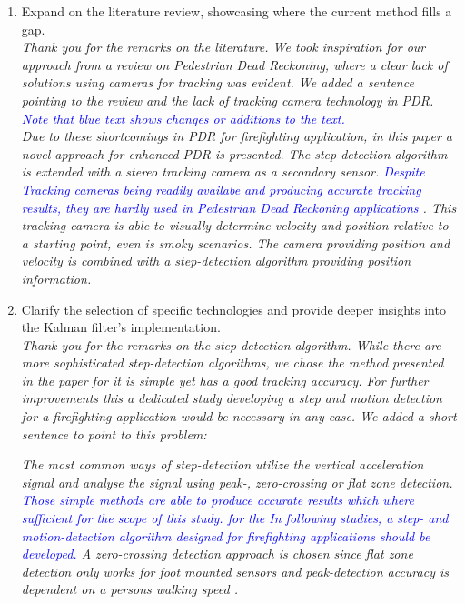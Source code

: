 \documentclass{article}
\begin{document}
\begin{enumerate}
\item Expand on the literature review, showcasing where the current method fills a gap.\\
\textit{Thank you for the remarks on the literature. We took inspiration for our approach from a review on Pedestrian Dead Reckoning, where a clear lack of solutions using cameras for tracking was evident. We added a sentence pointing to the review and the lack of tracking camera technology in PDR. \textcolor{blue}{Note that blue text shows changes or additions to the text.}}\\


\textit{Due to these shortcomings in PDR for firefighting application, in this paper  a novel approach for enhanced PDR is presented. The step-detection algorithm is extended with a stereo tracking camera as a secondary sensor. \textcolor{blue}{Despite Tracking cameras being readily availabe and producing accurate tracking results, they are hardly used in Pedestrian Dead Reckoning applications \cite{hou2021}}. This tracking camera is able to visually determine velocity and position relative to a starting point, even is smoky scenarios. The camera providing position and velocity is combined with a step-detection algorithm providing position information.}

\item Clarify the selection of specific technologies and provide deeper insights into the Kalman filter's implementation.\\
\textit{Thank you for the remarks on the step-detection algorithm. While there are more sophisticated step-detection algorithms, we chose the method presented in the paper for it is simple yet has a good tracking accuracy. For further improvements this a dedicated study developing a step and motion detection for a firefighting application would be necessary in any case. We added a short sentence to point to this problem:}

\textit{The most common ways of step-detection utilize  the vertical acceleration signal and analyse the signal using peak-, zero-crossing or flat zone detection. \textcolor{blue}{Those simple methods are able to produce accurate results which where sufficient for the scope of this study. for the In following studies, a step- and motion-detection algorithm designed for firefighting applications should be developed.} A zero-crossing detection approach is chosen since flat zone detection only works for foot mounted sensors and peak-detection accuracy is dependent on a persons walking speed \cite{shin2007}.}\\


\end{enumerate}
\end{document}
